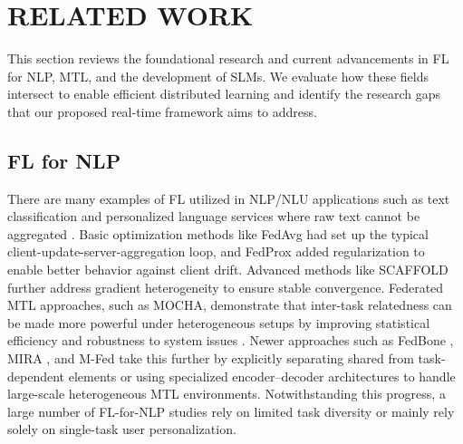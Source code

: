 
\section{RELATED WORK}
\label{sec:related_work}

This section reviews the foundational research and current advancements in FL for NLP, MTL, and the development of SLMs. We evaluate how these fields intersect to enable efficient distributed learning and identify the research gaps that our proposed real-time framework aims to address.

\subsection{FL for NLP}

There are many examples of FL utilized in NLP/NLU applications such as text classification and personalized language services where raw text cannot be aggregated \cite{mcmahan2017fedavg,li2020fedprox}. Basic optimization methods like FedAvg \cite{mcmahan2017fedavg} had set up the typical client-update-server-aggregation loop, and FedProx \cite{li2020fedprox} added regularization to enable better behavior against client drift. Advanced methods like SCAFFOLD \cite{karimireddy2020scaffold} further address gradient heterogeneity to ensure stable convergence. Federated MTL approaches, such as MOCHA, demonstrate that inter-task relatedness can be made more powerful under heterogeneous setups by improving statistical efficiency and robustness to system issues \cite{smith2017mocha}. Newer approaches such as FedBone \cite{chen2024fedbone}, MIRA \cite{elbakary2025mira}, and M-Fed \cite{zhou2025mfed} take this further by explicitly separating shared from task-dependent elements or using specialized encoder--decoder architectures to handle large-scale heterogeneous MTL environments. Notwithstanding this progress, a large number of FL-for-NLP studies rely on limited task diversity or mainly rely solely on single-task user personalization.

